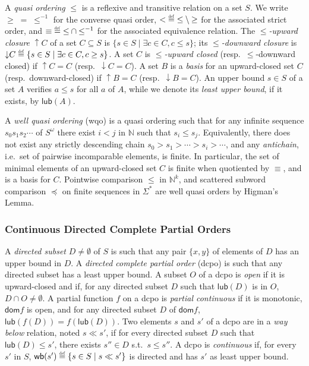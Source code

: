 \documentclass[11pt,reqno,a4paper]{amsart}
\newcommand{\eqdef}{\stackrel{\raisebox{-.15ex}{\scalebox{.5}{\upshape\textrm{def}}}}{=}}
\newcommand{\dc}{\mathop{\downarrow}\!}
\newcommand{\uc}{\mathop{\uparrow}\!}
\theoremstyle{plain}
\theoremstyle{definition}
\theoremstyle{remark}
\renewcommand{\paragraph}{\subsubsection*}
\begin{document}
A \emph{quasi ordering} $\leq$ is a reflexive and transitive relation on
a set $S$.  We write $\geq\;=\;\leq^{-1}$ for the converse quasi order,
${<}\eqdef{\leq}\setminus{\geq}$ for the associated strict order, and
${\equiv}\eqdef {\leq}\cap{\leq}^{-1}$ for the associated equivalence relation.  
The
\emph{$\leq$-upward closure} $\uc C$ of a set $C\subseteq S$ is
$\{s\in S\mid\exists c\in C,c\leq s\}$; its \emph{$\leq$-downward
closure} is $\dc C\eqdef\{s\in S\mid\exists c\in C,c\geq s\}$.  A set
$C$ is \emph{$\leq$-upward closed} (resp.\ $\leq$-downward closed) if
$\uc C=C$ (resp.\ $\dc C=C$).  A set $B$ is a \emph{basis} for an
upward-closed set $C$ (resp.\ downward-closed) if $\uc B=C$
(resp.\ $\dc B=C$).  An upper bound $s\in S$ of a set $A$ verifies
$a\leq s$ for all $a$ of $A$, while we denote its \emph{least upper
  bound}, if it exists, by $\mathsf{lub}(A)$.

A \emph{well quasi ordering} (wqo) is a quasi ordering such that for
any infinite sequence $s_0s_1s_2\cdots$ of $S^\omega$ there exist $i<j$ in
$\mathbb{N}$ such that $s_i\leq s_j$.  Equivalently, there does not
exist any strictly descending chain $s_0>s_1>\cdots>s_i>\cdots$, and
any \emph{antichain}, i.e.\ set of pairwise incomparable elements, is
finite.  In particular, the set of minimal elements of an
upward-closed set $C$ is finite when quotiented by $\equiv$, and is a basis for $C$.
Pointwise comparison $\leq$ in $\mathbb{N}^k$, and scattered subword
comparison $\preceq$ on finite sequences in $\Sigma^\ast$ are well
quasi orders by Higman's Lemma.

\paragraph{Continuous Directed Complete Partial Orders}
A \emph{directed subset} $D\neq\emptyset$ of $S$ is such that any pair
$\{x,y\}$ of elements of $D$ has an upper bound in $D$.  A
\emph{directed complete partial order} (dcpo) is such that any
directed subset has a least upper bound.  A subset $O$ of a dcpo is
\emph{open} if it is upward-closed and if, for any directed subset $D$
such that $\mathsf{lub}(D)$ is in $O$, $D\cap O\neq\emptyset$.  A
partial function $f$ on a dcpo is \emph{partial continuous} if it is
monotonic, $\mathsf{dom}f$ is open, and for any directed subset $D$ of
$\mathsf{dom}f$, $\mathsf{lub}(f(D))=f(\mathsf{lub}(D))$.  Two
elements $s$ and $s'$ of a dcpo are in a \emph{way below} relation,
noted $s\ll s'$, if for every directed subset $D$ such that
$\mathsf{lub}(D)\leq s'$, there exists $s''\in D$ s.t.\ $s\leq s''$.
A dcpo is \emph{continuous} if, for every $s'$ in $S$,
$\mathsf{wb}(s')\eqdef\{s\in S\mid s\ll s'\}$ is directed and has $s'$
as least upper bound.
\end{document}
